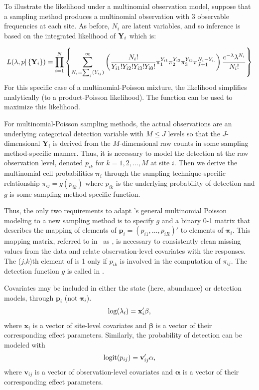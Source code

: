 \documentclass[article,shortnames]{jss}
\DeclareMathOperator{\logit}{logit}
\newcommand{\um}{\pkg{unmarked}}
\begin{document}
To illustrate the likelihood under a multinomial observation model, 
suppose that a sampling method produces a multinomial observation 
with 3 observable frequencies at each site. As before, $N_i$ are 
latent variables, and so inference is based on the integrated 
likelihood of ${\bf Y}_{i}$ which is:

\begin{equation}
L(\lambda, p | \left\{{\bf Y}_i\right\}) = 
 \prod_{i=1}^{N} \left\{ 
  \sum_{N_{i}=\sum_{j}(Y_{ij})}^{\infty} \left(
 \frac{N_{i}!}{ Y_{i1}! Y_{i2}! Y_{i3}! Y_{i0}!}
  \pi_{1}^{Y_{i1}}
  \pi_{2}^{Y_{i2}}
  \pi_{3}^{Y_{i3}}
  \pi_{J+1}^{N_{i}- Y_{i.}} \right)
 \frac{e^{-\lambda} \lambda^{N_i}}{N_i!} \right\}
\end{equation}
For this specific case of a multinomial-Poisson mixture, the likelihood 
simplifies analytically (to a product-Poisson likelihood).
The function  can be used to maximize this likelihood.

For multinomial-Poisson sampling methods, the actual observations are
an underlying categorical detection variable with $M \leq J$ levels so
that the $J$-dimensional $\mathbf Y_{i}$ is derived from the
$M$-dimensional raw counts in some sampling method-specific manner.
Thus, it is necessary to model the detection at the raw observation
level, denoted $p_{ik}$ for $k=1,2,\dots,M$ at site $i$.  Then we
derive the multinomial cell probabilities $\boldsymbol \pi_{i}$
through the sampling technique-specific relationship
$\pi_{ij}=g(p_{ik})$ where $p_{ik}$ is the underlying probability of
detection and $g$ is some sampling method-specific function.  

Thus, the only two requirements to adapt \um's general multinomial Poisson
modeling to a new sampling method is to specify $g$ and a binary 0-1
matrix that describes the mapping of elements of
$\mathbf p_{i} = (p_{i1},\dots,p_{iR})'$ to elements of
$\boldsymbol \pi_{i}$.  This mapping matrix, referred to in
\um\ as , is necessary to consistently clean
missing values from the data and relate observation-level covariates
with the responses.  The ($j$,$k$)th element of
 is 1 only if $p_{ik}$ is involved in the computation of
$\pi_{ij}$.  The detection function $g$ is called  in \um.

Covariates may be included in either the
state (here, abundance) or detection models, through $\mathbf p_{i}$
(not $\boldsymbol \pi_{i}$).
\begin{gather}
  \log(\lambda_i) = \mathbf x_i' \mathbf \beta, \notag
\end{gather}
where $\mathbf x_i$ is a vector of site-level covariates and $\mathbf \beta$
is a vector of their corresponding effect parameters.  Similarly, the
probability of detection can be modeled with
\begin{gather}
  \logit(p_{ij}) = \mathbf v_{ij}' \mathbf \alpha, \notag
\end{gather}
where $\mathbf v_{ij}$ is a vector of observation-level covariates and
$\mathbf \alpha$ is a vector of their corresponding effect parameters.
\end{document}
